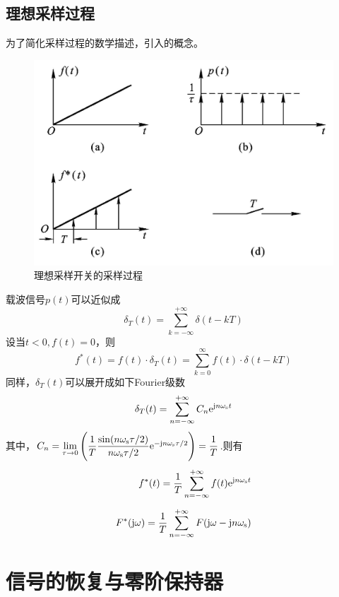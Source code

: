 \subsection{理想采样过程}
为了简化采样过程的数学描述，引入的概念。
\begin{figure}[!htb]
	\centering
	\includegraphics[width = 0.6\linewidth]{pic/理想采样开关.jpg}
	\vspace*{-0.5em}
	\caption{理想采样开关的采样过程}
	\label{理想采样开关的采样过程}
\end{figure}

载波信号$p(t)$可以近似成
\begin{equation}
	\delta_T(t) = \sum_{k = -\infty}^{+\infty}\delta(t - kT)
\end{equation}
设当$t<0,f(t) = 0$，则
\begin{equation}
	f^*(t) = f(t) \cdot \delta_T(t) = \sum_{k = 0}^{\infty} f(t) \cdot \delta(t - kT)
\end{equation}
同样，$\delta_T(t)$可以展开成如下Fourier级数
\begin{equation}
	\delta_T (t) = \sum_{n = -\infty}^{+\infty}C_n {\rm{e}}^{\text{j} n \omega_{\text{s}}t}
\end{equation}
其中，$C_n = \lim\limits_{\tau \to 0} \Bigg(\dfrac{1}{T}\dfrac{\sin(n\omega_\text{s}\tau /2)}{n \omega_\text{s}\tau/2}{\rm{e}}^{- \text{j} n \omega_\text{s}\tau / 2}\Bigg) = \dfrac{1}{T}$.则有
\begin{align}
	f^*(t) = \dfrac{1}{T}\sum_{n = -\infty}^{+\infty}f(t){\rm{e}}^{\text{j} n \omega_\text{s}t}\\[0.5em]
	F^*(\text{j} \omega) = \dfrac{1}{T}\sum_{n = -\infty}^{+\infty}F(\text{j} \omega - \text{j} n \omega_\text{s})
	\label{采样函数}
\end{align}

\section{信号的恢复与零阶保持器}
